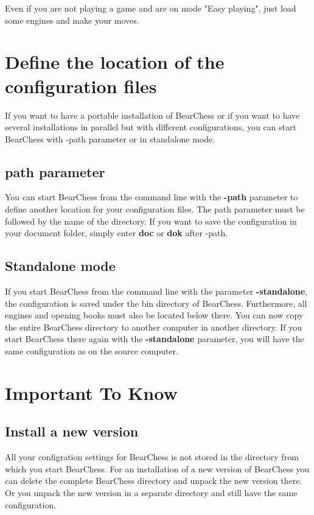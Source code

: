 \documentclass[11pt,a4paper]{article}
\begin{document}
Even if you are not playing a game and are on mode "Easy playing", just load some engines and make your moves.

\section{Define the location of the configuration files}
If you want to have a portable installation of BearChess or if you want to have several installations in parallel but with different configurations, you can start BearChess with -path parameter or in standalone mode.

\subsection{path parameter}
You can start BearChess from the command line with the \textbf{-path} parameter to define another location for your configuration files. The path parameter must be followed by the name of the directory. If you want to save the configuration in your document folder, simply enter \textbf{doc} or \textbf{dok} after -path.

\subsection{Standalone mode}
If you start BearChess from the command line with the parameter \textbf{-standalone}, the configuration is saved under the bin directory of BearChess. Furthermore, all engines and opening books must also be located below there. You can now copy the entire BearChess directory to another computer in another directory. If you start BearChess there again with the \textbf{-standalone} parameter, you will have the same configuration as on the source computer.

\section{Important To Know}

\subsection{Install a new version}
All your configration settings for BearChess is not stored in the directory from which you start BearChess. For an installation of a new version of BearChess you can delete the complete BearChess directory and unpack the new version there. Or you unpack the new version in a separate directory and still have the same configuration.
\end{document}
